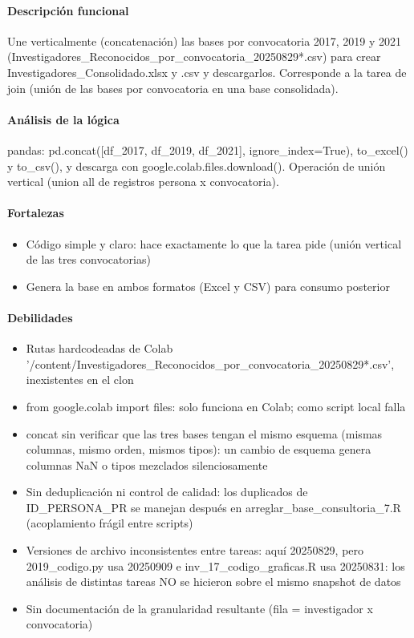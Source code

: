 \paragraph{Descripción funcional}
Une verticalmente (concatenación) las bases por convocatoria 2017, 2019 y 2021 (Investigadores\_Reconocidos\_por\_convocatoria\_20250829*.csv) para crear Investigadores\_Consolidado.xlsx y .csv y descargarlos. Corresponde a la tarea de join (unión de las bases por convocatoria en una base consolidada).

\paragraph{Análisis de la lógica}
pandas: pd.concat([df\_2017, df\_2019, df\_2021], ignore\_index=True), to\_excel() y to\_csv(), y descarga con google.colab.files.download(). Operación de unión vertical (union all de registros persona x convocatoria).

\paragraph{Fortalezas}
\begin{itemize}
  \item Código simple y claro: hace exactamente lo que la tarea pide (unión vertical de las tres convocatorias)
  \item Genera la base en ambos formatos (Excel y CSV) para consumo posterior
\end{itemize}

\paragraph{Debilidades}
\begin{itemize}
  \item Rutas hardcodeadas de Colab '/content/Investigadores\_Reconocidos\_por\_convocatoria\_20250829*.csv', inexistentes en el clon
  \item from google.colab import files: solo funciona en Colab; como script local falla
  \item concat sin verificar que las tres bases tengan el mismo esquema (mismas columnas, mismo orden, mismos tipos): un cambio de esquema genera columnas NaN o tipos mezclados silenciosamente
  \item Sin deduplicación ni control de calidad: los duplicados de ID\_PERSONA\_PR se manejan después en arreglar\_base\_consultoria\_7.R (acoplamiento frágil entre scripts)
  \item Versiones de archivo inconsistentes entre tareas: aquí 20250829, pero 2019\_codigo.py usa 20250909 e inv\_17\_codigo\_graficas.R usa 20250831: los análisis de distintas tareas NO se hicieron sobre el mismo snapshot de datos
  \item Sin documentación de la granularidad resultante (fila = investigador x convocatoria)
\end{itemize}

